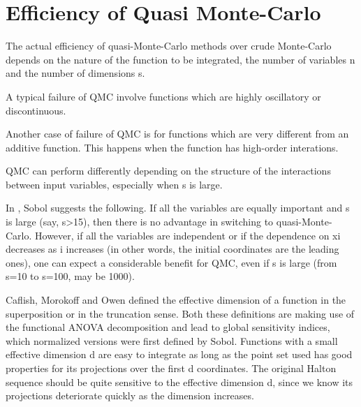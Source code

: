 
\section{Efficiency of Quasi Monte-Carlo}
    
The actual efficiency of quasi-Monte-Carlo methods over crude Monte-Carlo
depends on the nature of the function to be integrated, 
the number of variables n and the number of dimensions s.



A typical failure of QMC involve functions which are highly 
oscillatory or discontinuous.



Another case of failure of QMC is for functions which are 
very different from an additive function. 
This happens when the function has high-order interations. 



QMC can perform differently depending on the structure of the 
interactions between input variables, especially when s is large.



In \cite{Sobol1994}, Sobol suggests
the following. If all the variables are
equally important and s is large (say, s>15), then there is no
advantage in switching to quasi-Monte-Carlo. However, if all the
variables are independent or if the dependence on xi decreases as
i increases (in other words, the initial coordinates are the leading ones),
one can expect a considerable benefit for QMC, even if s is
large (from s=10 to s=100, may be 1000).



Caflish, Morokoff and Owen defined the effective dimension of a function
in the superposition or in the truncation sense. Both these definitions
are making use of the functional ANOVA decomposition and lead
to global sensitivity indices, which normalized versions were first defined
by Sobol.
Functions with a small effective dimension d are easy to integrate as long
as the point set used has good properties for its projections over the first d
coordinates. The original Halton sequence should be quite sensitive to the
effective dimension d, since we know its projections deteriorate quickly as
the dimension increases.
    
